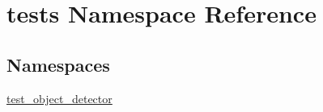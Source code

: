 \hypertarget{namespacetests}{}\section{tests Namespace Reference}
\label{namespacetests}
\subsection*{Namespaces}
\begin{DoxyCompactItemize}
\item 
 \hyperlink{namespacetests_1_1test__object__detector}{test\+\_\+object\+\_\+detector}
\end{DoxyCompactItemize}
